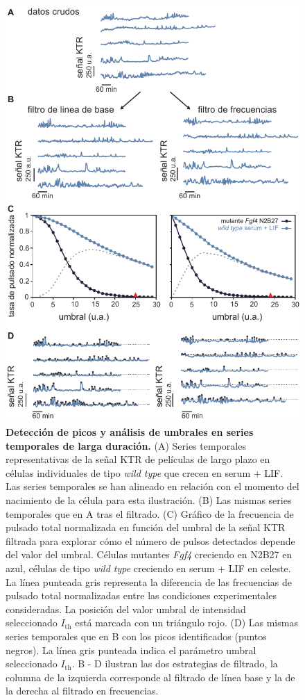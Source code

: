\documentclass[./main.tex]{subfiles}
\begin{document}
\begin{figure}
    \centering
    \includegraphics[width=1\columnwidth]{figures/chapter4/C4_pulse_detection.pdf}
    \caption{\textbf{Detección de picos y análisis de umbrales en series temporales de larga duración.} (A) Series temporales representativas de la señal KTR de películas de largo plazo en células individuales de tipo \textit{wild type} que crecen en serum + LIF. Las series temporales se han alineado en relación con el momento del nacimiento de la célula para esta ilustración. (B) Las mismas series temporales que en A tras el filtrado. (C) Gráfico de la frecuencia de pulsado total normalizada en función del umbral de la señal KTR filtrada para explorar cómo el número de pulsos detectados depende del valor del umbral. Células mutantes \textit{Fgf4} creciendo en N2B27 en azul, células de tipo \textit{wild type} creciendo en serum + LIF en celeste. La línea punteada gris representa la diferencia de las frecuencias de pulsado total normalizadas entre las condiciones experimentales consideradas. La posición del valor umbral de intensidad seleccionado $I_{\text{th}}$ está marcada con un triángulo rojo. (D) Las mismas series temporales que en B con los picos identificados (puntos negros). La línea gris punteada indica el parámetro umbral seleccionado $I_{\text{th}}$. B - D ilustran las dos estrategias de filtrado, la columna de la izquierda corresponde al filtrado de línea base y la de la derecha al filtrado en frecuencias.}
    \label{C4_fig:pulse_detection}
\end{figure}
\end{document}
